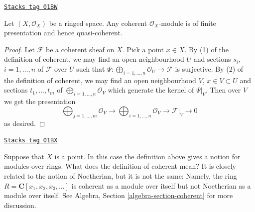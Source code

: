 \begin{lemma}
\label{modules-lemma-coherent-finite-presentation}
\href{https://stacks.math.columbia.edu/tag/01BW}{\texttt{Stacks tag 01BW}}

Let $(X, \mathcal{O}_X)$ be a ringed space.
Any coherent $\mathcal{O}_X$-module is of finite presentation
and hence quasi-coherent.
\end{lemma}

\begin{proof}
Let $\mathcal{F}$ be a coherent sheaf on $X$.
Pick a point $x \in X$.
By (1) of the definition of coherent, we may find an open neighbourhood $U$
and sections $s_i$, $i = 1, \ldots, n$ of $\mathcal{F}$ over $U$
such that $\Psi : \bigoplus_{i = 1, \ldots, n} \mathcal{O}_U \to \mathcal{F}$
is surjective. By (2) of the definition of coherent, we may find
an open neighbourhood $V$, $x \in V \subset U$ and sections
$t_1, \ldots, t_m$ of $\bigoplus_{i = 1, \ldots, n} \mathcal{O}_V$
which generate the kernel of $\Psi|_V$. Then over $V$ we get the
presentation
$$
\bigoplus\nolimits_{j = 1, \ldots, m}
\mathcal{O}_V
\longrightarrow
\bigoplus\nolimits_{i = 1, \ldots, n}
\mathcal{O}_V
\to
\mathcal{F}|_V
\to
0
$$
as desired.
\end{proof}

\begin{example}
\label{modules-example-coherent-not-Noetherian}
\href{https://stacks.math.columbia.edu/tag/01BX}{\texttt{Stacks tag 01BX}}

Suppose that $X$ is a point. In this case the definition
above gives a notion for modules over rings.
What does the definition of coherent mean?
It is closely related to the notion of Noetherian,
but it is not the same: Namely, the ring
$R = \mathbf{C}[x_1, x_2, x_3, \ldots]$ is coherent
as a module over itself but not Noetherian as a module
over itself. See Algebra, Section \ref{algebra-section-coherent}
for more discussion.
\end{example}

